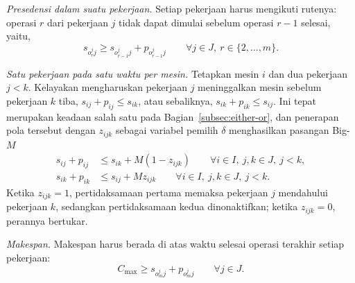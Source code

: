 \emph{Presedensi dalam suatu pekerjaan.}
Setiap pekerjaan harus mengikuti rutenya: operasi $r$ dari pekerjaan $j$ tidak dapat dimulai sebelum operasi $r-1$ selesai, yaitu,
$$
s_{o^{j}_{r} j} \geq s_{o^{j}_{r-1} j} + p_{o^{j}_{r-1} j} \qquad \forall j \in J, \ r \in \{2, \dots, m\}.
$$

\emph{Satu pekerjaan pada satu waktu per mesin.}
Tetapkan mesin $i$ dan dua pekerjaan $j < k$.
Kelayakan mengharuskan pekerjaan $j$ meninggalkan mesin sebelum pekerjaan $k$ tiba, $s_{ij} + p_{ij} \leq s_{ik}$, atau sebaliknya, $s_{ik} + p_{ik} \leq s_{ij}$.
Ini tepat merupakan keadaan salah satu pada Bagian~\ref{subsec:either-or}, dan penerapan pola tersebut dengan $z_{ijk}$ sebagai variabel pemilih $\delta$ menghasilkan pasangan Big-$M$
$$
\begin{aligned}
s_{ij} + p_{ij} &\leq s_{ik} + M(1 - z_{ijk}) \qquad \forall i \in I, \ j,k \in J, \ j < k,\\
s_{ik} + p_{ik} &\leq s_{ij} + M z_{ijk} \qquad \forall i \in I, \ j,k \in J, \ j < k.
\end{aligned}
$$
Ketika $z_{ijk} = 1$, pertidaksamaan pertama memaksa pekerjaan $j$ mendahului pekerjaan $k$, sedangkan pertidaksamaan kedua dinonaktifkan; ketika $z_{ijk} = 0$, perannya bertukar.

\emph{Makespan.}
Makespan harus berada di atas waktu selesai operasi terakhir setiap pekerjaan:
$$
C_{\max} \geq s_{o^{j}_{m} j} + p_{o^{j}_{m} j} \qquad \forall j \in J.
$$

